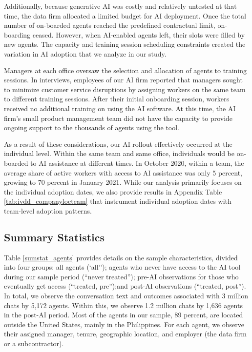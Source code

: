 \documentclass[11pt]{article}
\begin{document}
Additionally, because generative AI was costly and relatively untested at that time, the data firm allocated a limited budget for AI deployment. Once the total number of on-boarded agents reached the predefined contractual limit, on-boarding ceased. However, when AI-enabled agents left, their slots were filled by new agents. The capacity and training session scheduling constraints created the variation in AI adoption that we analyze in our study.

Managers at each office oversaw the selection and allocation of agents to training sessions.  In interviews, employees of our AI firm reported that managers sought to minimize customer service disruptions by assigning workers on the same team to different training sessions.  After their initial onboarding session, workers received no additional training on using the AI software. At this time, the AI firm's small product management team did not have the capacity to provide ongoing support to the thousands of agents using the tool.

As a result of these considerations, our AI rollout effectively occurred at the individual level. Within the same team and same office, individuals would be on-boarded to AI assistance at different times. In October 2020, within a team, the average share of active workers with access to AI assistance was only 5 percent, growing to 70 percent in January 2021.  While our analysis primarily focuses on the individual adoption dates, we also provide results in Appendix Table \ref{tab:ivdd_companylocteam} that instrument individual adoption dates with team-level adoption patterns.


\subsection{Summary Statistics}\label{sec:sumstats}

Table \ref{sumstat_agents} provides details on the sample characteristics, divided into four groups: all agents (`all''); agents who never have access to the AI tool during our sample period (``never treated''); pre-AI observations for those who eventually get access (``treated, pre'');and post-AI observations (``treated, post'').  In total, we observe the conversation text and outcomes associated with 3 million chats by 5,172 agents.  Within this, we observe 1.2 million chats by 1,636 agents in the post-AI period.  Most of the agents in our sample, 89 percent, are located outside the United States, mainly in the Philippines.  For each agent, we observe their assigned manager, tenure, geographic location, and employer (the data firm or a subcontractor). 
\end{document}
